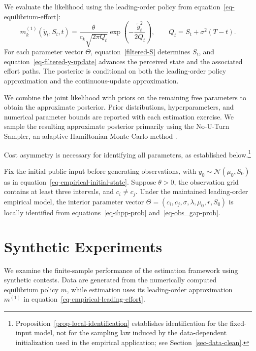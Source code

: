 \documentclass[mnsc]{informs3}
\begin{document}
{We evaluate the likelihood using the leading-order policy from equation~\eqref{eq-equilibrium-effort}:}
\begin{equation}\label{eq-empirical-leading-effort}
{m_k^{(1)}(\tilde y_t,S_t,t)
=\frac{\theta}{c_k\sqrt{2\pi Q_t}}
\exp\!\left(-\frac{\tilde y_t^2}{2Q_t}\right),
\qquad Q_t=S_t+\sigma^2(T-t).}
\end{equation}
{For each parameter vector $\Theta$, equation~\eqref{filtered-S} determines $S_t$, and equation~\eqref{eq-filtered-y-update} advances the perceived state and the associated effort paths. The posterior is conditional on both the leading-order policy approximation and the continuous-update approximation.}

We combine the joint likelihood with priors on the remaining free parameters to obtain the approximate posterior. Prior distributions, hyperparameters, and numerical parameter bounds are reported with each estimation exercise.
We sample the resulting approximate posterior primarily using the No-U-Turn Sampler, an adaptive Hamiltonian Monte Carlo method \citep{hoffman2014NUTS}.

Cost asymmetry is necessary for identifying all parameters, as established below.\footnote{Proposition~\ref{prop-local-identification} establishes identification for the fixed-input model, not for the sampling law induced by the data-dependent initialization used in the empirical application; see Section~\ref{sec-data-clean}.}

\begin{proposition}\label{prop-local-identification}
{Fix the initial public input before generating observations, with $y_0\sim\mathcal N(\mu_0,S_0)$ as in equation~\eqref{eq-empirical-initial-state}. Suppose $\theta>0$, the observation grid contains at least three intervals, and $c_i\ne c_j$. Under the maintained leading-order empirical model, the interior parameter vector $\Theta=(c_i,c_j,\sigma,\lambda,\mu_0,r,S_0)$ is locally identified from equations~\eqref{eq-ihpp-prob} and~\eqref{eq-obs_gap-prob}.}
\end{proposition}


\section{Synthetic Experiments}\label{sect-synthetic}

{We examine the finite-sample performance of the estimation framework using synthetic contests. Data are generated from the numerically computed equilibrium policy $m$, while estimation uses its leading-order approximation $m^{(1)}$ in equation~\eqref{eq-empirical-leading-effort}.}
\end{document}
